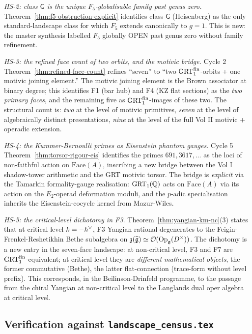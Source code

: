 \emph{HS-2: class $\mathsf{G}$ is the unique $F_5$-globalisable family
past genus zero.}
Theorem~\ref{thm:f5-obstruction-explicit} identifies class $\mathsf{G}$
(Heisenberg) as the only standard-landscape class for which $F_5$
extends canonically to $g = 1$. This is new: the master synthesis
labelled $F_5$ globally OPEN past genus zero without family refinement.

\emph{HS-3: the refined face count of two orbits, and the motivic
bridge.}
Cycle 2 Theorem~\ref{thm:refined-face-count} refines ``seven'' to
``two $\mathrm{GRT}_1^{\mathrm{fin}}$-orbits + one motivic joining element.'' The motivic
joining element is the Brown associator at binary degree; this
identifies F1 (bar hub) and F4 (KZ flat sections) as the \emph{two
primary faces}, and the remaining five as $\mathrm{GRT}_1^{\mathrm{fin}}$-images of these
two. The structural count is: \emph{two} at the level of motivic
primitives, \emph{seven} at the level of algebraically distinct
presentations, \emph{nine} at the level of the full Vol II motivic
+ operadic extension.

\emph{HS-4: the Kummer-Bernoulli primes as Eisenstein phantom gauges.}
Cycle 5 Theorem~\ref{thm:torsor-rigour-eis} identifies the primes
$691, 3617, \ldots$ as the loci of non-faithful action on
$\mathrm{Face}(A)$, inscribing a new bridge between the Vol I
shadow-tower arithmetic and the GRT motivic torsor. The bridge is
\emph{explicit} via the Tamarkin formality-gauge realisation:
$\mathrm{GRT}_1(\mathbb{Q})$ acts on $\mathrm{Face}(A)$ via its action on the
$E_2$-operad deformation moduli, and the $p$-adic specialisation
inherits the Eisenstein-cocycle kernel from Mazur-Wiles.

\emph{HS-5: the critical-level dichotomy in F3.}
Theorem~\ref{thm:yangian-km-nc}(3) states that at critical level
$k = -h^{\vee}$, F3 Yangian rational degenerates to the
Feigin-Frenkel-Reshetikhin Bethe subalgebra on
$\mathfrak{z}(\widehat{\mathfrak{g}}) \simeq \mathcal{O}(\mathrm{Op}_{\mathfrak{g}}(D^\times))$.
The dichotomy is a new entry in the seven-face landscape: at
non-critical level, F3 and F7 are $\mathrm{GRT}_1^{\mathrm{fin}}$-equivalent; at critical
level they are \emph{different mathematical objects}, the former
commutative (Bethe), the latter flat-connection (trace-form without
level prefix). This corresponds, in the Beilinson-Drinfeld programme,
to the passage from the chiral Yangian at non-critical level to the
Langlands dual oper algebra at critical level.

\subsection*{Verification against \texttt{landscape\_census.tex}}

